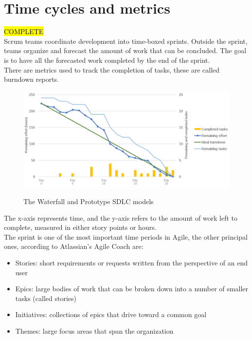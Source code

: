 \section{Time cycles and metrics}
	\hl{COMPLETE}\\
	Scrum teams coordinate development into time-boxed sprints.
	Outside the sprint, teams organize and forecast the amount of work that can be concluded.
	The goal is to have all the forecasted work completed by the end of the sprint.\\
	There are metrics used to track the completion of tasks, these are called burndown reports.
	\begin{figure}[H]
		\centering
		\includegraphics[width=\textwidth]{resources/burndown}\\
		\caption{The Waterfall and Prototype SDLC models}
	\end{figure}
	The x-axis represents time, and the y-axis refers to the amount of work left to complete, measured in either story points or hours.\\
	The sprint is one of the most important time periods in Agile, the other principal ones, according to Atlassian's Agile Coach\cite{epics-stories-themes} are:
	\begin{itemize}
		\item Stories: short requirements or requests written from the perspective of an end user
		\item Epics: large bodies of work that can be broken down into a number of smaller tasks (called stories)
		\item Initiatives: collections of epics that drive toward a common goal
		\item Themes: large focus areas that span the organization
	\end{itemize}
